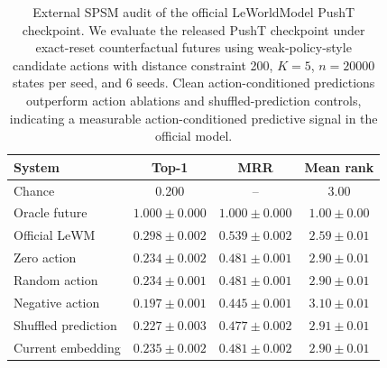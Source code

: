 \begin{table}[t]
\centering
\caption{External SPSM audit of the official LeWorldModel PushT checkpoint. We evaluate the released PushT checkpoint under exact-reset counterfactual futures using weak-policy-style candidate actions with distance constraint 200, $K=5$, $n=20000$ states per seed, and 6 seeds. Clean action-conditioned predictions outperform action ablations and shuffled-prediction controls, indicating a measurable action-conditioned predictive signal in the official model.}
\label{tab:official-lewm-spsm}
\begin{tabular}{lccc}
\toprule
System & Top-1 & MRR & Mean rank \\
\midrule
Chance & 0.200 & -- & 3.00 \\
Oracle future & $1.000 \pm 0.000$ & $1.000 \pm 0.000$ & $1.00 \pm 0.00$ \\
Official LeWM & $0.298 \pm 0.002$ & $0.539 \pm 0.002$ & $2.59 \pm 0.01$ \\
Zero action & $0.234 \pm 0.002$ & $0.481 \pm 0.001$ & $2.90 \pm 0.01$ \\
Random action & $0.234 \pm 0.001$ & $0.481 \pm 0.001$ & $2.90 \pm 0.01$ \\
Negative action & $0.197 \pm 0.001$ & $0.445 \pm 0.001$ & $3.10 \pm 0.01$ \\
Shuffled prediction & $0.227 \pm 0.003$ & $0.477 \pm 0.002$ & $2.91 \pm 0.01$ \\
Current embedding & $0.235 \pm 0.002$ & $0.481 \pm 0.002$ & $2.90 \pm 0.01$ \\
\bottomrule
\end{tabular}
\end{table}